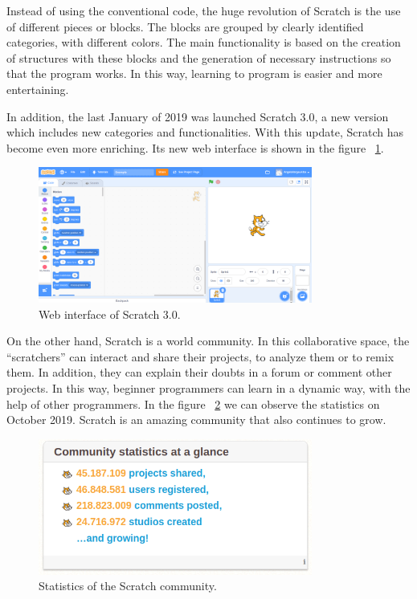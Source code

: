 Instead of using the conventional code, the huge revolution of Scratch is the use of different pieces or blocks. The blocks are grouped by clearly identified categories, with different colors. The main functionality is based on the creation of structures with these blocks and the generation of necessary instructions so that the program works. In this way, learning to program is easier and more entertaining.

In addition, the last January of 2019 was launched Scratch 3.0, a new version which includes new categories and functionalities. With this update, Scratch has become even more enriching. Its new web interface is shown in the figure ~\ref{fig:scratch}.


\begin{figure}
  \centering
  \includegraphics[width=9cm, keepaspectratio]{img/scratch.png}
  \caption{Web interface of Scratch 3.0.}
  \label{fig:scratch}
\end{figure}

On the other hand, Scratch is a world community. In this collaborative space, the ``scratchers'' can interact and share their projects, to analyze them or to remix them. In addition, they can explain their doubts in a forum or comment other projects. In this way, beginner programmers can learn in a dynamic way, with the help of other programmers. In the figure ~\ref{fig:statistics_scratch} we can observe the statistics on October 2019. Scratch is an amazing community that also continues to grow. 

\begin{figure}
  \centering
  \includegraphics[width=9cm, keepaspectratio]{img/statistics_scratch.png}
  \caption{Statistics of the Scratch community.}
  \label{fig:statistics_scratch}
\end{figure}



